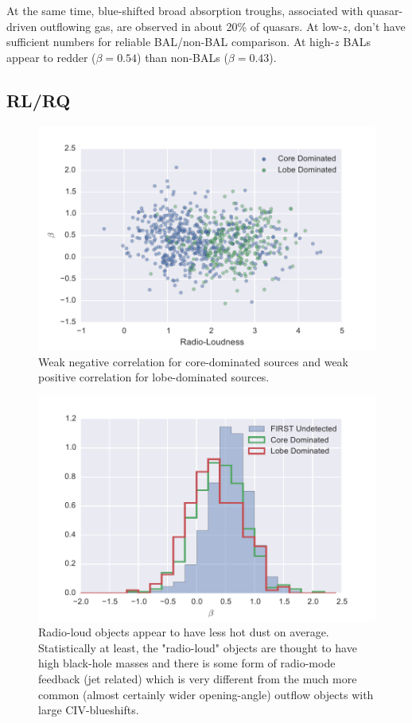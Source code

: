 At the same time, blue-shifted broad absorption troughs, associated with quasar-driven outflowing gas, are observed in about 20\% of quasars. 
At low-$z$, don't have sufficient numbers for reliable BAL/non-BAL comparison. At high-$z$ BALs appear to redder ($\beta=0.54$) than non-BALs ($\beta=0.43$). 

\subsection{RL/RQ}

\begin{figure}
\centering
  \includegraphics[width=\columnwidth]{figures/chapter06/radioloudness_beta}
\caption{Weak negative correlation for core-dominated sources and weak positive correlation for lobe-dominated sources.}
  \label{fig:fig}
\end{figure}

\begin{figure}
\centering
  \includegraphics[width=\columnwidth]{figures/chapter06/radiohist}
\caption{Radio-loud objects appear to have less hot dust on average.  Statistically at least, the "radio-loud" objects are thought to have high black-hole masses and there is some form of radio-mode feedback (jet related) which is very different from the much more common (almost certainly wider opening-angle) outflow objects with large CIV-blueshifts.}
  \label{fig:fig}
\end{figure}


